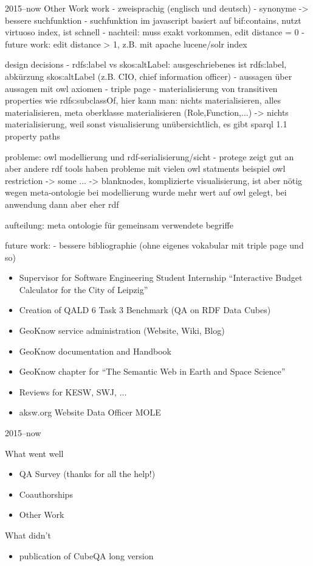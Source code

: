 \documentclass[14pt,aspectratio=1610]{beamer}
\begin{document}
\begin{frame}{2015--now Other Work}
work
- zweisprachig (englisch und deutsch)
- synonyme -> bessere suchfunktion
- suchfunktion im javascript basiert auf bif:contains, nutzt virtuoso index, ist schnell
- nachteil: muss exakt vorkommen, edit distance = 0
- future work: edit distance > 1, z.B. mit apache lucene/solr index


design decisions
- rdfs:label vs skos:altLabel: ausgeschriebenes ist rdfs:label, abkürzung skos:altLabel (z.B. CIO, chief information officer)
- aussagen über aussagen mit owl axiomen
- triple page
- materialisierung von transitiven properties wie rdfs:subclassOf, hier kann man: nichts materialisieren, alles materialisieren, meta oberklasse materialisieren (Role,Function,...)
-> nichts materialisierung, weil sonst visualisierung unübersichtlich, es gibt sparql 1.1 property paths


probleme:
owl modellierung und rdf-serialisierung/sicht
- protege zeigt gut an aber andere rdf tools haben probleme mit vielen owl statments
beispiel owl restriction -> some ... -> blanknodes, komplizierte visualisierung, ist aber nötig wegen meta-ontologie
bei modellierung wurde mehr wert auf owl gelegt, bei anwendung dann aber eher rdf

aufteilung:
meta ontologie für gemeinsam verwendete begriffe


future work:
- bessere bibliographie (ohne eigenes vokabular mit triple page und so)

\begin{itemize}
\item Supervisor for Software Engineering Student Internship \enquote{Interactive Budget Calculator for the City of Leipzig}
\item Creation of QALD 6 Task 3 Benchmark (QA on RDF Data Cubes)
\item GeoKnow service administration (Website, Wiki, Blog)
\item GeoKnow documentation and Handbook
\item GeoKnow chapter for \enquote{The Semantic Web in Earth and Space Science}
\item Reviews for KESW, SWJ, $\ldots$
\item aksw.org Website Data Officer MOLE
\end{itemize}
\end{frame}

\begin{frame}{2015--now }
\begin{block}{What went well}
\begin{itemize}
\item QA Survey (thanks for all the help!) 
\item Coauthorships 
\item Other Work 
\end{itemize}
\end{block}
\begin{block}{What didn't}
\begin{itemize}
\item publication of CubeQA long version
\end{itemize}
\end{block}
\end{frame}
\end{document}
